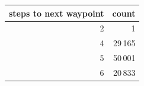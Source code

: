 \begin{tabular}{rr}\toprule steps to next waypoint & count\\\midrule
2 & 1 \\
4 & 29\,165 \\
5 & 50\,001 \\
6 & 20\,833 \\
\bottomrule\end{tabular}
